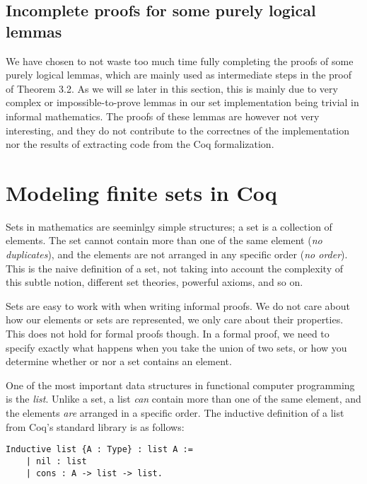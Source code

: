 \subsection{Incomplete proofs for some purely logical lemmas}

We have chosen to not waste too much time fully completing the proofs of some purely logical lemmas,
which are mainly used as intermediate steps in the proof of Theorem 3.2.
As we will se later in this section, this is mainly due to
very complex or impossible-to-prove lemmas in our set implementation
being trivial in informal mathematics.
The proofs of these lemmas are however not very interesting,
and they do not contribute to the correctnes of the implementation nor
the results of extracting code from the Coq formalization.

\section{Modeling finite sets in Coq}

Sets in mathematics are seeminlgy simple structures; a set is a collection of elements.
The set cannot contain more than one of the same element (\textit{no duplicates}), and the elements are not arranged in any
specific order (\textit{no order}).
This is the naive definition of a set, not taking into account the complexity of this subtle notion,
different set theories, powerful axioms, and so on.

Sets are easy to work with when writing informal proofs.
We do not care about how our elements or sets are represented, we only care about their properties.
This does not hold for formal proofs though. In a formal proof, we need to specify exactly what happens
when you take the union of two sets, or how you determine whether or nor a set contains an element.

One of the most important data structures in functional computer programming is the \textit{list}.
Unlike a set, a list \textit{can} contain more than one of the same element, and the elements \textit{are} arranged in a
specific order.
The inductive definition of a list from Coq's standard library is as follows:

\begin{minipage}{\linewidth}
\begin{lstlisting}[language=Coq, label={lst:list_def}, caption={Inductive def. of list type in Coq}]
Inductive list {A : Type} : list A :=
    | nil : list
    | cons : A -> list -> list.
\end{lstlisting}
\end{minipage}

